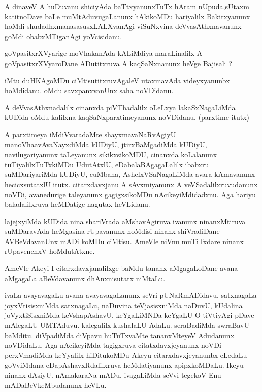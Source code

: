 \documentclass{article}
\begin{document}
\begin{mn}%
A dinaveV A huDuvanu shiciyAda baTtxyanunxTuTx hAram nUpuda,sUtaxm katitnoDave baLe 
muMtAduvugaLanunx hAkikoMDu hariyalilx Bakitxyanunx hoMdi shudadhxmanasasusxLALXvanAgi 
viSuNxvina deVvasAthxnavanunx goMdi obabxMTiganAgi yoVcisidanu.
\end{mn}

\begin{mn}%
goVpasitxrXVyarige moVhakanAda kALiMdiya maraLinalilx A goVpasitxrXVyaroDane ADutitxruva A 
kaqSaNxnanunx heVge Bajisali ?
\end{mn}

\begin{mn}%
iMtu duHKAgoMDu ciMtisutitxruvAgaleV utaxmavAda videyxyanunbx hoMdidanu. oMdu 
savxpanxvanUnx saha noVDidanu.
\end{mn}

\begin{mn}%
A deVvasAthxnadalilx cinanxda piVThadalilx oLeLxya  lakaSxNagaLiMda kUDida oMdu kalilxna 
kaqSaNxparxtimeyanunx noVDidanu. (parxtime itutx)
\end{mn}

\begin{mn}%
A parxtimeya iMdiVvaradaMte shayxmavaNaRvAgiyU manoVhaavAvaNayxdiMda kUDiyU, 
jtirxBaMgadiMda kUDiyU, navilugariyanunx taLeyanunx sikikxsikoMDU, cinanxda  koLalanunx 
tuTiyalilxTuTxkiMDu UdutAtxlU, eDabalaBAgagaLalilx ibabxru suMDariyariMda kUDiyU, cuMbana, 
AshelxVSaNagaLiMda avara kAmavanunx hecicxsutatxlU itutx. citarxdavxjanu A 
sAvxmiyanunx A veVSadalilxruvudanunx noVDi, avanedurige taleyanunx gagigxsikoMDu 
nAcikeyiMdidadxnu. Aga hariyu baladalilxruva heMDatige nagutax heVLidanu.
\end{mn}

\begin{mn}%
lajejxyiMda kUDida nina shariVrada aMshavAgiruva ivanunx ninanxMtiruva suMDaravAda 
heMgasina rUpavanunx hoMdisi ninanx shiVradiDane AVBeVdavanUnx mADi koMDu ciMtisu. AmeVle 
niVnu muTiTxdare ninanx rUpavenenxV hoMdutAtxne.
\end{mn}

\begin{mn}%
AmeVle Akeyi I citarxdavxjanalilxge baMdu tananx aMgagaLoDane avana aMgagaLa aBeVdavanunx 
dhAnxnisutatx niMtaLu.
\end{mn}

\begin{mn}%
ivaLa avayavagaLu avana avayavagaLanunx seVri pUNaRmADidavu. satxnagaLa joyxVtisisxniMda 
satxnagaLu, naDuvina teVjasisxniMda naDuvU, kUdalina joVyxtiSisxniMda keVshapAshavU, 
keYgaLiMNDa keYgaLU O tiVtiyAgi pDave mAlegaLU UMTAduvu. kalegalilx kushalaLU AdaLu. 
seraBadiMda swraBavU baMditu. diVpadiMda diVpavu huTuTxvaMte tananxMteyeV Adudanunx 
noVDidaLu. Aga nAcikeyiMda tagigxruva citatxdavxjeyanunx noVDi perxVmadiMda keYyalilx 
hiDitukoMDu Akeyu citarxdavxjeyanunbx eLedaLu goVviMdana eDapAshavxRdalilxruva 
heMdatiyanunx apipxkoMDaLu. Ikeyu ninanx dAsiyU. nAmakaraNa mADu. ivagaLiMda seVvi tegekoV 
Enu mADaBeVkeMbudanunx heVLu.
\end{mn}
\end{document}
